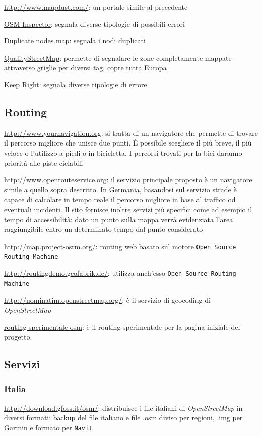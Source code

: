 \documentclass[a4paper,twoside,12pt,]{article}
\newcommand{\osm}{\emph{OpenStreetMap}\xspace}
\newcommand{\soft}[1]{\texttt{#1}}
\begin{document}
\url{http://www.mapdust.com/}: un portale simile al precedente

\href{http://tools.geofabrik.de/osmi/}{OSM Inspector}: segnala diverse tipologie di possibili errori

\href{http://matt.dev.openstreetmap.org/dupe_nodes/}{Duplicate nodes map}: segnala i nodi duplicati

\href{http://osmqa2.qualitystreetmap.org/}{QualityStreetMap}: permette di segnalare le zone completamente mappate attraverso griglie per diversi tag, copre tutta Europa

\href{http://keepright.ipax.at/}{Keep Right}: segnala diverse tipologie di errore

\subsection{Routing}
\url{http://www.yournavigation.org}: si tratta di un navigatore che permette di trovare il percorso migliore che unisce due punti. È possibile scegliere il più breve, il più veloce o l'utilizzo a piedi o in bicicletta. I percorsi trovati per la bici daranno priorità alle piste ciclabili

\url{http://www.openrouteservice.org}: il servizio principale proposto è un navigatore simile a quello sopra descritto. In Germania, basandosi sul servizio strade è capace di calcolare in tempo reale il percorso migliore in base al traffico od eventuali incidenti. Il sito fornisce inoltre servizi più specifici come ad esempio il tempo di accessibilità: dato un punto sulla mappa verrà evidenziata l'area raggiungibile entro un determinato tempo dal punto considerato

\url{http://map.project-osrm.org/}: routing web basato sul motore \soft{Open Source Routing Machine}

\url{http://routingdemo.geofabrik.de/}: utilizza anch'esso \soft{Open Source Routing Machine}

\url{http://nominatim.openstreetmap.org/}: è il servizio di geocoding di \osm

\href{http://nroets.dev.openstreetmap.org/demo/index.html?lat=42.8&lon=12.45&zoom=6&layers=B000FTFTT}{routing sperimentale osm}: è il routing sperimentale per la pagina iniziale del progetto.

\subsection{Servizi}

\subsubsection{Italia}
\url{http://download.gfoss.it/osm/}: distribuisce i file italiani di \osm in diversi formati: backup del file italiano e file .osm diviso per regioni, .img per Garmin e formato per \soft{Navit}
\end{document}
